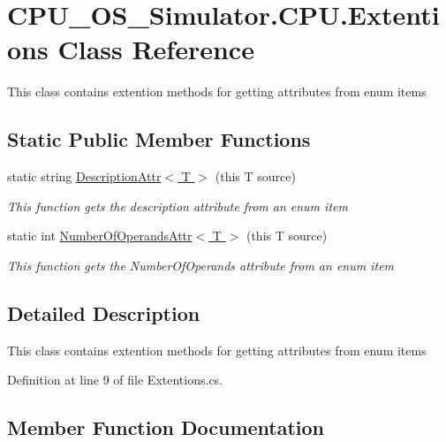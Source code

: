 \hypertarget{class_c_p_u___o_s___simulator_1_1_c_p_u_1_1_extentions}{}\section{C\+P\+U\+\_\+\+O\+S\+\_\+\+Simulator.\+C\+P\+U.\+Extentions Class Reference}
\label{class_c_p_u___o_s___simulator_1_1_c_p_u_1_1_extentions}


This class contains extention methods for getting attributes from enum items  


\subsection*{Static Public Member Functions}
\begin{DoxyCompactItemize}
\item 
static string \hyperlink{class_c_p_u___o_s___simulator_1_1_c_p_u_1_1_extentions_a57b9eeabb06f5b69160698e7106b2193}{Description\+Attr$<$ T $>$} (this T source)
\begin{DoxyCompactList}\small\item\em This function gets the description attribute from an enum item \end{DoxyCompactList}\item 
static int \hyperlink{class_c_p_u___o_s___simulator_1_1_c_p_u_1_1_extentions_a5391dde3088335a6e3754e1273f0ff40}{Number\+Of\+Operands\+Attr$<$ T $>$} (this T source)
\begin{DoxyCompactList}\small\item\em This function gets the Number\+Of\+Operands attribute from an enum item \end{DoxyCompactList}\end{DoxyCompactItemize}


\subsection{Detailed Description}
This class contains extention methods for getting attributes from enum items 



Definition at line 9 of file Extentions.\+cs.



\subsection{Member Function Documentation}
\hypertarget{class_c_p_u___o_s___simulator_1_1_c_p_u_1_1_extentions_a57b9eeabb06f5b69160698e7106b2193}{}
